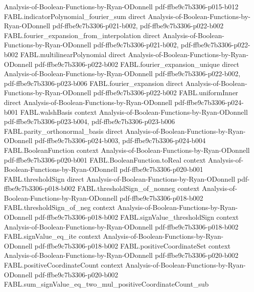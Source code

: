 \begin{theorem}
  {Analysis-of-Boolean-Functions-by-Ryan-ODonnell}
  {pdf-ffbe9c7b3306-p015-b012}
\proofstep
  {FABL.indicatorPolynomial_fourier_sum}
  {direct}
  {Analysis-of-Boolean-Functions-by-Ryan-ODonnell}
  {pdf-ffbe9c7b3306-p021-b002,
    pdf-ffbe9c7b3306-p022-b002}
\proofstep
  {FABL.fourier_expansion_from_interpolation}
  {direct}
  {Analysis-of-Boolean-Functions-by-Ryan-ODonnell}
  {pdf-ffbe9c7b3306-p021-b002,
    pdf-ffbe9c7b3306-p022-b002}
\proofstep
  {FABL.multilinearPolynomial}
  {direct}
  {Analysis-of-Boolean-Functions-by-Ryan-ODonnell}
  {pdf-ffbe9c7b3306-p022-b002}
\proofstep
  {FABL.fourier_expansion_unique}
  {direct}
  {Analysis-of-Boolean-Functions-by-Ryan-ODonnell}
  {pdf-ffbe9c7b3306-p022-b002,
    pdf-ffbe9c7b3306-p023-b006}
\proofstep
  {FABL.fourier_expansion}
  {direct}
  {Analysis-of-Boolean-Functions-by-Ryan-ODonnell}
  {pdf-ffbe9c7b3306-p022-b002}
\proofstep
  {FABL.uniformInner}
  {direct}
  {Analysis-of-Boolean-Functions-by-Ryan-ODonnell}
  {pdf-ffbe9c7b3306-p024-b001}
\proofstep
  {FABL.walshBasis}
  {context}
  {Analysis-of-Boolean-Functions-by-Ryan-ODonnell}
  {pdf-ffbe9c7b3306-p023-b004,
    pdf-ffbe9c7b3306-p023-b006}
\proofstep
  {FABL.parity_orthonormal_basis}
  {direct}
  {Analysis-of-Boolean-Functions-by-Ryan-ODonnell}
  {pdf-ffbe9c7b3306-p024-b003,
    pdf-ffbe9c7b3306-p024-b004}
\proofstep
  {FABL.BooleanFunction}
  {context}
  {Analysis-of-Boolean-Functions-by-Ryan-ODonnell}
  {pdf-ffbe9c7b3306-p020-b001}
\proofstep
  {FABL.BooleanFunction.toReal}
  {context}
  {Analysis-of-Boolean-Functions-by-Ryan-ODonnell}
  {pdf-ffbe9c7b3306-p020-b001}
\proofstep
  {FABL.thresholdSign}
  {direct}
  {Analysis-of-Boolean-Functions-by-Ryan-ODonnell}
  {pdf-ffbe9c7b3306-p018-b002}
\proofstep
  {FABL.thresholdSign_of_nonneg}
  {context}
  {Analysis-of-Boolean-Functions-by-Ryan-ODonnell}
  {pdf-ffbe9c7b3306-p018-b002}
\proofstep
  {FABL.thresholdSign_of_neg}
  {context}
  {Analysis-of-Boolean-Functions-by-Ryan-ODonnell}
  {pdf-ffbe9c7b3306-p018-b002}
\proofstep
  {FABL.signValue_thresholdSign}
  {context}
  {Analysis-of-Boolean-Functions-by-Ryan-ODonnell}
  {pdf-ffbe9c7b3306-p018-b002}
\proofstep
  {FABL.signValue_eq_ite}
  {context}
  {Analysis-of-Boolean-Functions-by-Ryan-ODonnell}
  {pdf-ffbe9c7b3306-p018-b002}
\proofstep
  {FABL.positiveCoordinateSet}
  {context}
  {Analysis-of-Boolean-Functions-by-Ryan-ODonnell}
  {pdf-ffbe9c7b3306-p020-b002}
\proofstep
  {FABL.positiveCoordinateCount}
  {context}
  {Analysis-of-Boolean-Functions-by-Ryan-ODonnell}
  {pdf-ffbe9c7b3306-p020-b002}
\proofstep
  {FABL.sum_signValue_eq_two_mul_positiveCoordinateCount_sub}

\end{theorem}
